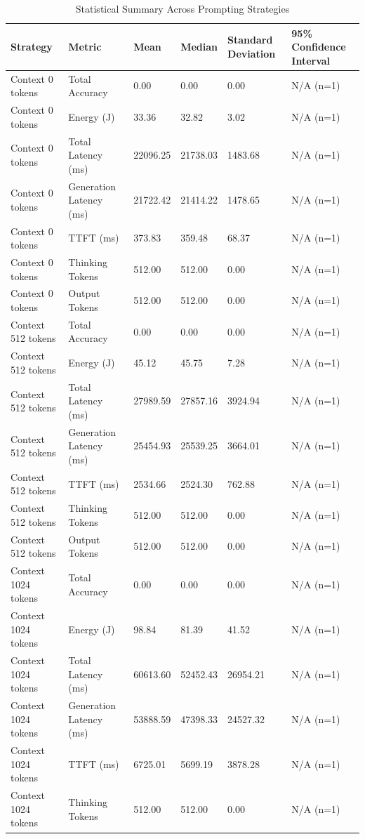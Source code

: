 \begin{table}
\caption{Statistical Summary Across Prompting Strategies}
\label{tab:statistical_summary}
\begin{tabular}{llllll}
\toprule
Strategy & Metric & Mean & Median & Standard Deviation & 95\% Confidence Interval \\
\midrule
Context 0 tokens & Total Accuracy & 0.00 & 0.00 & 0.00 & N/A (n=1) \\
Context 0 tokens & Energy (J) & 33.36 & 32.82 & 3.02 & N/A (n=1) \\
Context 0 tokens & Total Latency (ms) & 22096.25 & 21738.03 & 1483.68 & N/A (n=1) \\
Context 0 tokens & Generation Latency (ms) & 21722.42 & 21414.22 & 1478.65 & N/A (n=1) \\
Context 0 tokens & TTFT (ms) & 373.83 & 359.48 & 68.37 & N/A (n=1) \\
Context 0 tokens & Thinking Tokens & 512.00 & 512.00 & 0.00 & N/A (n=1) \\
Context 0 tokens & Output Tokens & 512.00 & 512.00 & 0.00 & N/A (n=1) \\
Context 512 tokens & Total Accuracy & 0.00 & 0.00 & 0.00 & N/A (n=1) \\
Context 512 tokens & Energy (J) & 45.12 & 45.75 & 7.28 & N/A (n=1) \\
Context 512 tokens & Total Latency (ms) & 27989.59 & 27857.16 & 3924.94 & N/A (n=1) \\
Context 512 tokens & Generation Latency (ms) & 25454.93 & 25539.25 & 3664.01 & N/A (n=1) \\
Context 512 tokens & TTFT (ms) & 2534.66 & 2524.30 & 762.88 & N/A (n=1) \\
Context 512 tokens & Thinking Tokens & 512.00 & 512.00 & 0.00 & N/A (n=1) \\
Context 512 tokens & Output Tokens & 512.00 & 512.00 & 0.00 & N/A (n=1) \\
Context 1024 tokens & Total Accuracy & 0.00 & 0.00 & 0.00 & N/A (n=1) \\
Context 1024 tokens & Energy (J) & 98.84 & 81.39 & 41.52 & N/A (n=1) \\
Context 1024 tokens & Total Latency (ms) & 60613.60 & 52452.43 & 26954.21 & N/A (n=1) \\
Context 1024 tokens & Generation Latency (ms) & 53888.59 & 47398.33 & 24527.32 & N/A (n=1) \\
Context 1024 tokens & TTFT (ms) & 6725.01 & 5699.19 & 3878.28 & N/A (n=1) \\
Context 1024 tokens & Thinking Tokens & 512.00 & 512.00 & 0.00 & N/A (n=1) \\

\end{tabular}
\end{table}
